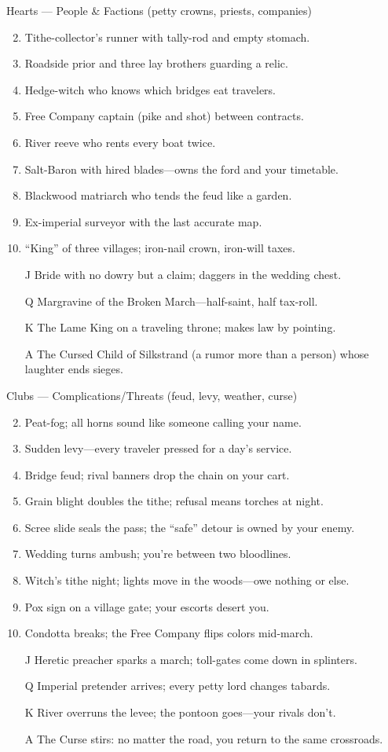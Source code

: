 Hearts --- People \& Factions (petty crowns, priests, companies)
\begin{enumerate}
\setcounter{enumi}{1}
\item Tithe-collector's runner with tally-rod and empty stomach.
\item Roadside prior and three lay brothers guarding a relic.
\item Hedge-witch who knows which bridges eat travelers.
\item Free Company captain (pike and shot) between contracts.
\item River reeve who rents every boat twice.
\item Salt-Baron with hired blades---owns the ford and your timetable.
\item Blackwood matriarch who tends the feud like a garden.
\item Ex-imperial surveyor with the last accurate map.
\item ``King'' of three villages; iron-nail crown, iron-will taxes.
\item[J] Bride with no dowry but a claim; daggers in the wedding chest.
\item[Q] Margravine of the Broken March---half-saint, half tax-roll.
\item[K] The Lame King on a traveling throne; makes law by pointing.
\item[A] The Cursed Child of Silkstrand (a rumor more than a person) whose laughter ends sieges.
\end{enumerate}

Clubs --- Complications/Threats (feud, levy, weather, curse)
\begin{enumerate}
\setcounter{enumi}{1}
\item Peat-fog; all horns sound like someone calling your name.
\item Sudden levy---every traveler pressed for a day's service.
\item Bridge feud; rival banners drop the chain on your cart.
\item Grain blight doubles the tithe; refusal means torches at night.
\item Scree slide seals the pass; the ``safe'' detour is owned by your enemy.
\item Wedding turns ambush; you're between two bloodlines.
\item Witch's tithe night; lights move in the woods---owe nothing or else.
\item Pox sign on a village gate; your escorts desert you.
\item Condotta breaks; the Free Company flips colors mid-march.
\item[J] Heretic preacher sparks a march; toll-gates come down in splinters.
\item[Q] Imperial pretender arrives; every petty lord changes tabards.
\item[K] River overruns the levee; the pontoon goes---your rivals don't.
\item[A] The Curse stirs: no matter the road, you return to the same crossroads.
\end{enumerate}

